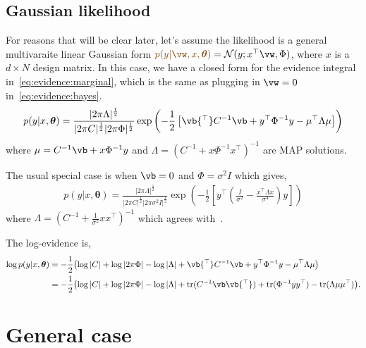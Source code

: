\documentclass{article}
\newcounter{ct}
\DeclareMathOperator*{\tr}{tr}
\newcommand{\inv}{^{-1}}
\newcommand{\trp}{{^\top}} %
\newcommand{\Gaussian}{\ensuremath{\mathcal{N}}} %
\newcommand{\weight}{\vw}
\newcommand{\hyp}{\bm{\theta}}
\newcommand{\likelihood}{\ensuremath{\textcolor{goldenbrown}{p(y|\weight,x,\hyp)}}}
\begin{document}
\subsection{Gaussian likelihood}
For reasons that will be clear later, let's assume the likelihood is a general multivaraite linear Gaussian form $\likelihood = \Gaussian(y; x\trp \weight, \Phi)$, where $x$ is a $d \times N$ design matrix.
In this case, we have a closed form for the evidence integral in~\eqref{eq:evidence:marginal}, which is the same as plugging in $\weight = 0$ in~\eqref{eq:evidence:bayes}.
\begin{align}
p(y|x,\hyp) =
    \frac{|2\pi\Lambda|^{\frac{1}{2}}}
    {|2\pi C|^{\frac{1}{2}} |2\pi \Phi|^{\frac{1}{2}}}
    \exp\left(
	-\frac{1}{2}
	\left[
	    \vb\trp C\inv \vb + y\trp\Phi\inv y
	    - \mu\trp \Lambda \mu
	\right]
    \right)
\end{align}
where 
$\mu = C\inv \vb + x\Phi\inv y$ and
$\Lambda = \left( C\inv + x\Phi\inv x\trp \right)\inv$ are MAP solutions.

The usual special case is when $\vb = 0$ and $\Phi = \sigma^2 I$ which gives,
\begin{align}
    p(y|x,\hyp) =
    \frac{|2\pi\Lambda|^{\frac{1}{2}}}
    {|2\pi C|^{\frac{1}{2}} |2\pi \sigma^2 I|^{\frac{1}{2}}}
    \exp\left(
	-\frac{1}{2}
	\left[
	    y\trp 
	    \left(
		\frac{I}{\sigma^2}
		-
		\frac{
		    x\trp 
		    \Lambda
		    x
		}{\sigma^4}
	    \right)
	    y
	\right]
    \right)
\end{align}
where $\Lambda = \left( C\inv + \frac{1}{\sigma^2}x x\trp \right)\inv$ which agrees with~\cite{Sahani2002}.

The log-evidence is,
\begin{align}
\log p(y|x,\hyp) 
&=
    -\frac{1}{2}
    \bigl(
	\log|C|
	+ \log|2\pi\Phi|
	- \log|\Lambda|
	+ \vb\trp C\inv \vb
	+ y\trp\Phi\inv y
	- \mu\trp \Lambda \mu
    \bigr)
    \\
&=
    -\frac{1}{2}
    \bigl(
	\log|C|
	+ \log|2\pi\Phi|
	- \log|\Lambda|
	+ \tr(C\inv \vb \vb\trp)
	+ \tr(\Phi\inv y y\trp)
	- \tr(\Lambda \mu \mu\trp)
    \bigr).
\end{align}


\section{General case}



\end{document}
